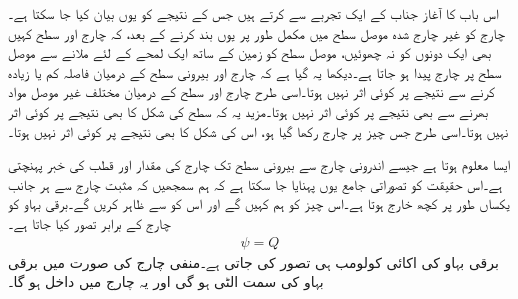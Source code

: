 
اس باب کا آغاز جناب  کے ایک تجربے سے کرتے ہیں جس کے نتیجے کو یوں بیان کیا جا سکتا ہے۔چارج  کو غیر چارج شدہ موصل سطح میں مکمل طور پر یوں بند کرنے کے بعد، کہ چارج اور سطح  کہیں بھی ایک دونوں کو نہ چھوئیں، موصل سطح کو زمین کے ساتھ ایک لمحے کے لئے ملانے سے موصل سطح پر  چارج پیدا ہو جاتا ہے۔دیکھا یہ گیا ہے کہ چارج اور بیرونی سطح کے درمیان فاصلہ کم یا زیادہ کرنے سے نتیجے پر کوئی اثر نہیں ہوتا۔اسی طرح چارج اور سطح کے درمیان مختلف غیر موصل مواد بھرنے سے بھی نتیجے پر کوئی اثر نہیں ہوتا۔مزید یہ کہ سطح کی شکل کا بھی نتیجے پر کوئی اثر نہیں ہوتا۔اسی طرح جس چیز پر چارج  رکھا گیا ہو، اس کی شکل کا بھی نتیجے پر کوئی اثر نہیں ہوتا۔ 

ایسا معلوم ہوتا ہے جیسے اندرونی چارج سے بیرونی سطح تک چارج کی مقدار اور قطب کی خبر پہنچتی ہے۔اس حقیقت کو تصوراتی جامع یوں پہنایا جا سکتا ہے کہ ہم سمجھیں کہ مثبت چارج سے ہر جانب یکساں طور پر کچھ خارج ہوتا ہے۔اس چیز کو ہم   کہیں گے اور اس کو  سے ظاہر کریں گے۔برقی بہاو کو چارج کے برابر تصور کیا جاتا ہے۔
\begin{align}
\psi=Q
\end{align}
برقی بہاو کی اکائی  کولومب  ہی تصور کی جاتی ہے۔منفی چارج کی صورت میں برقی بہاو کی سمت الٹی ہو گی اور یہ چارج میں داخل ہو گا۔

